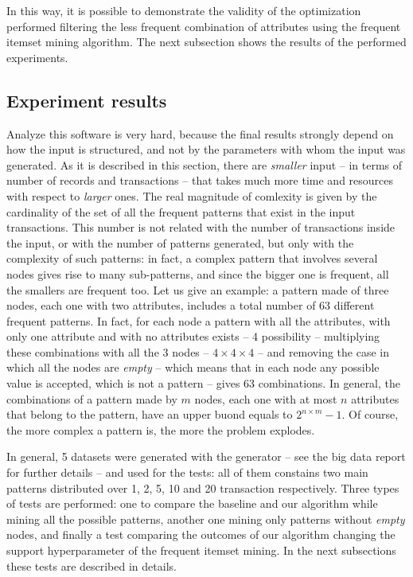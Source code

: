 \documentclass{acm_proc_article-sp-sigmod09}
\begin{document}
In this way, it is possible to demonstrate the validity of the optimization performed filtering the less frequent combination of attributes using the frequent itemset mining algorithm. The next subsection shows the results of the performed experiments.

\subsection{Experiment results}
\label{sec:exp-res}
Analyze this software is very hard, because the final results strongly depend on how the input is structured, and not by the parameters with whom the input was generated. As it is described in this section, there are \emph{smaller} input -- in terms of number of records and transactions -- that takes much more time and resources with respect to \emph{larger} ones. The real magnitude of comlexity is given by the cardinality of the set of all the frequent patterns that exist in the input transactions. This number is not related with the number of transactions inside the input, or with the number of patterns generated, but only with the complexity of such patterns: in fact, a complex pattern that involves several nodes gives rise to many sub-patterns, and since the bigger one is frequent, all the smallers are frequent too. Let us give an example: a pattern made of three nodes, each one with two attributes, includes a total number of 63 different frequent patterns. In fact, for each node a pattern with all the attributes, with only one attribute and with no attributes exists -- 4 possibility -- multiplying these combinations with all the 3 nodes -- $4 \times 4 \times 4$ -- and removing the case in which all the nodes are \emph{empty} -- which means that in each node any possible value is accepted, which is not a pattern -- gives 63 combinations. In general, the combinations of a pattern made by $m$ nodes, each one with at most $n$ attributes that belong to the pattern, have an upper buond equals to $2^{n \times m} - 1$. Of course, the more complex a pattern is, the more the problem explodes.

In general, 5 datasets were generated with the generator -- see the big data report for further details -- and used for the tests: all of them constains two main patterns distributed over 1, 2, 5, 10 and 20 transaction respectively. Three types of tests are performed: one to compare the baseline and our algorithm while mining all the possible patterns, another one mining only patterns without \emph{empty} nodes, and finally a test comparing the outcomes of our algorithm changing the support hyperparameter of the frequent itemset mining. In the next subsections these tests are described in details.
\end{document}

